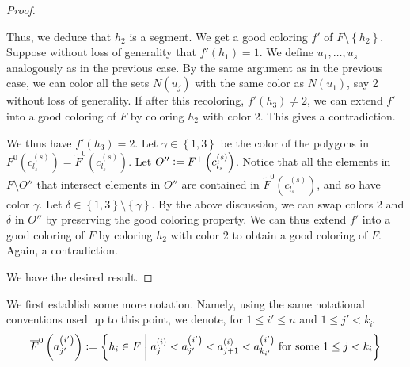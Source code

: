 \documentclass[12pt]{article}
\theoremstyle{definition}
\newcommand{\defeq}{\vcentcolon=}
\begin{document}
\begin{proof}
\begin{itemize}
             Thus, we deduce that $h_2$ is a segment.
             We get a good coloring $f'$ of
             $F \setminus \left\{h_2\right\}$.
             Suppose without loss of generality
             that $f'\left(h_1\right) = 1$.
             We define $u_1, \ldots, u_{s}$ 
             analogously as in the previous case.
             By the same argument as in the previous case,
             we can color all the sets 
             $N\left(u_{j}\right)$ with the
             same color as $N\left(u_1\right)$,
             say 2 without loss of generality.
             If after this recoloring,
             $f'\left(h_3\right) \neq 2$, 
             we can extend $f'$ into a
             good coloring of $F$ by 
             coloring $h_2$ with color 2.
             This gives a contradiction.
             
             We thus have $f'\left(h_3\right) = 2$.
             Let $\gamma \in \left\{1, 3\right\}$
             be the color of the polygons
             in $F^{0}\left(c_{l_{s}}^{\left(s\right)}\right)
             = \widetilde{F}^{0}\left(
             c_{l_{s}}^{\left(s\right)}\right)$.
             Let $O'' \defeq F^{+}\left(
             c_{l_{s}}^{\left(s\right)}\right)$.
             Notice that all the elements
             in $F \setminus O''$ 
             that intersect elements in $O''$
             are contained in $\widetilde{F}^{0}\left(
             c_{l_{s}}^{\left(s\right)}\right)$,
             and so have color $\gamma$.
             Let $\delta \in \left\{1, 3\right\}
             \setminus \left\{\gamma\right\}$.
             By the above discussion, we can swap colors
             2 and $\delta$ in $O''$
             by preserving the good coloring property.
             We can thus extend $f'$ into a
             good coloring of $F$ by
             coloring $h_2$ with color 2
             to obtain a good coloring of $F$.
             Again, a contradiction.
         \end{itemize} 
     We have the desired result. 
     \end{proof}

     We first establish some more notation.
     Namely, using the same notational conventions
     used up to this point, we denote, for
     $1 \leq i' \leq n$ and $1 \leq j' < k_{i'}$
     \begin{gather*}
         \overline{F}^{0}\left(a_{j'}^{\left(i'\right)}\right) \defeq
         \left\{h_{i} \in F \;\middle|\;
         a_{j}^{\left(i\right)} <
         a_{j'}^{\left(i'\right)} <
         a_{j+1}^{\left(i\right)} <
         a_{k_{i'}}^{\left(i'\right)}
         \text{ for some }
         1 \leq j < k_{i}\right\}
     \end{gather*}
     
\end{document}
